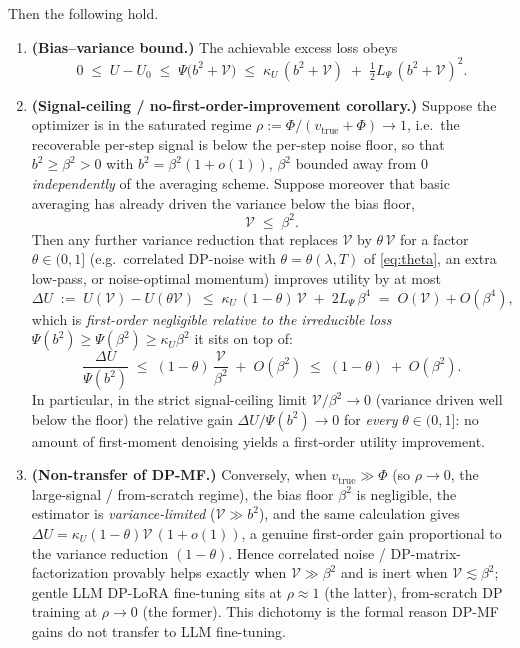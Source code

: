 \begin{theorem}
Then the following hold.
\begin{enumerate}[leftmargin=2.2em]
\item\textbf{(Bias--variance bound.)} The achievable excess loss obeys
\begin{equation}
\label{eq:bv-bound}
0\;\le\;U-U_0\;\le\;\Psi\!\big(b^2+\mathcal V\big)\;\le\;\kappa_U\,(b^2+\mathcal V)\;+\;\tfrac{1}{2}L_\Psi\,(b^2+\mathcal V)^2 .
\end{equation}
\item\textbf{(Signal-ceiling / no-first-order-improvement corollary.)} Suppose the optimizer is in
the saturated regime $\rho:=\Phi/(v_{\mathrm{true}}+\Phi)\to 1$, i.e.\ the recoverable per-step
signal is below the per-step noise floor, so that $b^2\ge\beta^2>0$ with $b^2=\beta^2(1+o(1))$,
$\beta^2$ bounded away from $0$ \emph{independently} of the averaging scheme. Suppose moreover that
basic averaging has already driven the variance below the bias floor,
\begin{equation}
\label{eq:var-floor}
\mathcal V\;\le\;\beta^2 .
\end{equation}
Then any further variance reduction that replaces $\mathcal V$ by $\theta\,\mathcal V$ for a factor
$\theta\in(0,1]$ (e.g.\ correlated DP-noise with $\theta=\theta(\lambda,T)$ of
\eqref{eq:theta}, an extra low-pass, or noise-optimal momentum) improves utility by at most
\begin{equation}
\label{eq:no-improve}
\Delta U\;:=\;U(\mathcal V)-U(\theta\mathcal V)\;\le\;\kappa_U\,(1-\theta)\,\mathcal V\;+\;2L_\Psi\,\beta^4
\;=\;O(\mathcal V)+O(\beta^4),
\end{equation}
which is \emph{first-order negligible relative to the irreducible loss}
$\Psi(b^2)\ge \Psi(\beta^2)\ge\kappa_U\beta^2$ it sits on top of:
\begin{equation}
\label{eq:ratio}
\frac{\Delta U}{\Psi(b^2)}\;\le\;(1-\theta)\,\frac{\mathcal V}{\beta^2}\;+\;O(\beta^2)\;\le\;(1-\theta)\;+\;O(\beta^2).
\end{equation}
In particular, in the strict signal-ceiling limit $\mathcal V/\beta^2\to 0$ (variance driven well
below the floor) the relative gain $\Delta U/\Psi(b^2)\to 0$ for \emph{every} $\theta\in(0,1]$: no
amount of first-moment denoising yields a first-order utility improvement.
\item\textbf{(Non-transfer of DP-MF.)} Conversely, when $v_{\mathrm{true}}\gg\Phi$ (so $\rho\to0$,
the large-signal / from-scratch regime), the bias floor $\beta^2$ is negligible, the estimator is
\emph{variance-limited} ($\mathcal V\gg b^2$), and the same calculation gives
$\Delta U=\kappa_U(1-\theta)\mathcal V\,(1+o(1))$, a genuine first-order gain proportional to the
variance reduction $(1-\theta)$. Hence correlated noise / DP-matrix-factorization provably helps
exactly when $\mathcal V\gg\beta^2$ and is inert when $\mathcal V\lesssim\beta^2$; gentle LLM
DP-LoRA fine-tuning sits at $\rho\approx1$ (the latter), from-scratch DP training at $\rho\to0$
(the former). This dichotomy is the formal reason DP-MF gains do not transfer to LLM fine-tuning.
\end{enumerate}
\end{theorem}

